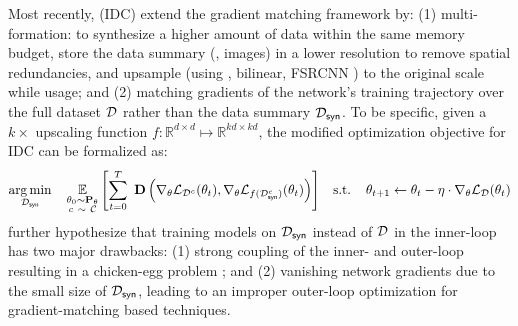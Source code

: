 \documentclass[10pt]{article} %
\begin{document}
Most recently, \citet{idc} (IDC) extend the gradient matching framework by: (1) multi-formation: to synthesize a higher amount of data within the same memory budget, store the data summary (\eg, images) in a lower resolution to remove spatial redundancies, and upsample (using \eg, bilinear, FSRCNN \citep{fsrcnn}) to the original scale while usage; and (2) matching gradients of the network's training trajectory over the full dataset $\mathcal{D}$ rather than the data summary $\mathcal{D}_{\mathsf{syn}}$. To be specific, given a $k \times$ upscaling function $f : \mathbb{R}^{d \times d} \mapsto \mathbb{R}^{kd \times kd}$, the modified optimization objective for IDC can be formalized as:
\begin{equation} \label{eqn:idc_gradient_matching}
\begin{gathered}
    \underset{\mathcal{D}_{\mathsf{syn}}}{\operatorname{arg} \operatorname{min}} \hspace{0.4cm} \underset{\substack{\theta_0 \sim \mathbf{P}_\theta\\c ~\sim~ \mathcal{C}}}{\mathbb{E}} \left[\sum_{t=0}^T ~ \mathbf{D}\left( \nabla_\theta \mathcal{L}_{\mathcal{D}^c}(\theta_t), \nabla_\theta \mathcal{L}_{f(\mathcal{D}_{\mathsf{syn}}^c)}(\theta_t) \right)\right] \hspace{0.3cm}
    \text{s.t.} \hspace{0.4cm} \theta_{t+1} \leftarrow \theta_t - \eta \cdot \nabla_\theta \mathcal{L}_{\mathcal{D}}(\theta_t)
\end{gathered}
\end{equation}
\citet{idc} further hypothesize that training models on $\mathcal{D}_{\mathsf{syn}}$ instead of $\mathcal{D}$ in the inner-loop has two major drawbacks: (1) strong coupling of the inner- and outer-loop resulting in a chicken-egg problem \citep{em}; and (2) vanishing network gradients due to the small size of $\mathcal{D}_{\mathsf{syn}}$, leading to an improper outer-loop optimization for gradient-matching based techniques.
\end{document}
